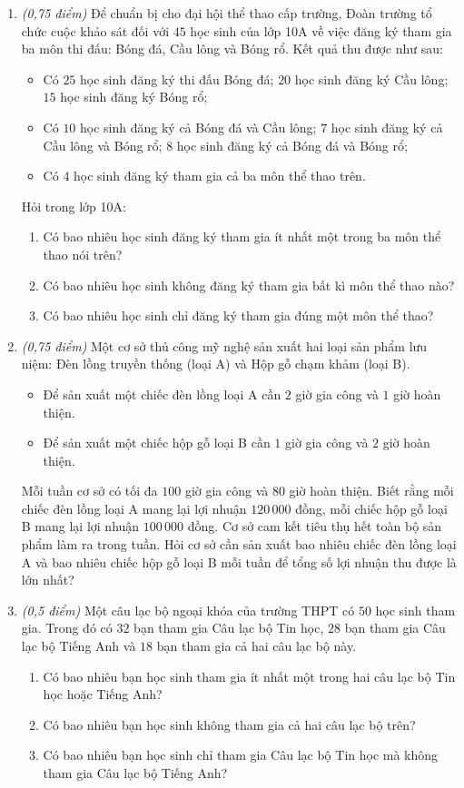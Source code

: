 \documentclass[12pt,a4paper]{article}
\begin{document}
\begin{enumerate}[resume]
\item \textit{(0,75 điểm)} Để chuẩn bị cho đại hội thể thao cấp trường, Đoàn trường tổ chức cuộc khảo sát đối với $45$ học sinh của lớp 10A về việc đăng ký tham gia ba môn thi đấu: Bóng đá, Cầu lông và Bóng rổ. Kết quả thu được như sau:
\begin{itemize}[leftmargin=0.5cm, itemsep=0.5pt]
    \item Có $25$ học sinh đăng ký thi đấu Bóng đá; $20$ học sinh đăng ký Cầu lông; $15$ học sinh đăng ký Bóng rổ;
    \item Có $10$ học sinh đăng ký cả Bóng đá và Cầu lông; $7$ học sinh đăng ký cả Cầu lông và Bóng rổ; $8$ học sinh đăng ký cả Bóng đá và Bóng rổ;
    \item Có $4$ học sinh đăng ký tham gia cả ba môn thể thao trên.
\end{itemize}
Hỏi trong lớp 10A:
\begin{enumerate}
    \item Có bao nhiêu học sinh đăng ký tham gia ít nhất một trong ba môn thể thao nói trên?
    \item Có bao nhiêu học sinh không đăng ký tham gia bất kì môn thể thao nào?
    \item Có bao nhiêu học sinh chỉ đăng ký tham gia đúng một môn thể thao?
\end{enumerate}

\item \textit{(0,75 điểm)} Một cơ sở thủ công mỹ nghệ sản xuất hai loại sản phẩm lưu niệm: Đèn lồng truyền thống (loại A) và Hộp gỗ chạm khảm (loại B).
\begin{itemize}[leftmargin=0.5cm, itemsep=0.5pt]
    \item Để sản xuất một chiếc đèn lồng loại A cần $2$ giờ gia công và $1$ giờ hoàn thiện.
    \item Để sản xuất một chiếc hộp gỗ loại B cần $1$ giờ gia công và $2$ giờ hoàn thiện.
\end{itemize}
Mỗi tuần cơ sở có tối đa $100$ giờ gia công và $80$ giờ hoàn thiện. Biết rằng mỗi chiếc đèn lồng loại A mang lại lợi nhuận $120\,000$ đồng, mỗi chiếc hộp gỗ loại B mang lại lợi nhuận $100\,000$ đồng. Cơ sở cam kết tiêu thụ hết toàn bộ sản phẩm làm ra trong tuần. Hỏi cơ sở cần sản xuất bao nhiêu chiếc đèn lồng loại A và bao nhiêu chiếc hộp gỗ loại B mỗi tuần để tổng số lợi nhuận thu được là lớn nhất?

\item \textit{(0,5 điểm)} Một câu lạc bộ ngoại khóa của trường THPT có $50$ học sinh tham gia. Trong đó có $32$ bạn tham gia Câu lạc bộ Tin học, $28$ bạn tham gia Câu lạc bộ Tiếng Anh và $18$ bạn tham gia cả hai câu lạc bộ này.
\begin{enumerate}
    \item Có bao nhiêu bạn học sinh tham gia ít nhất một trong hai câu lạc bộ Tin học hoặc Tiếng Anh?
    \item Có bao nhiêu bạn học sinh không tham gia cả hai câu lạc bộ trên?
    \item Có bao nhiêu bạn học sinh chỉ tham gia Câu lạc bộ Tin học mà không tham gia Câu lạc bộ Tiếng Anh?
\end{enumerate}
\end{enumerate}
\end{document}
